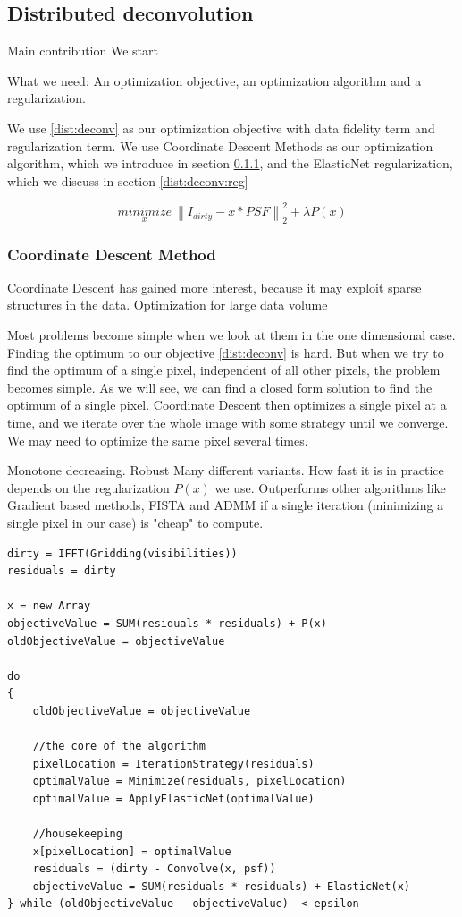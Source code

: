 \subsection{Distributed deconvolution}

Main contribution
We start 

What we need: An optimization objective, an optimization algorithm and a regularization. 

We use \eqref{dist:deconv} as our optimization objective with data fidelity term and regularization term. We use Coordinate Descent Methods as our optimization algorithm, which we introduce in section \ref{dist:deconv:cd}, and the ElasticNet regularization, which we discuss in section \ref{dist:deconv:reg}

\begin{equation}\label{dist:deconv}
\underset{x}{minimize} \: \left \| I_{dirty} - x * PSF \right \|_2^2 + \lambda P(x)
\end{equation}



\subsubsection{Coordinate Descent Method}\label{dist:deconv:cd}
Coordinate Descent has gained more interest, because it may exploit sparse structures in the data.
Optimization for large data volume

Most problems become simple when we look at them in the one dimensional case. Finding the optimum to our objective \eqref{dist:deconv} is hard. But when we try to find the optimum of a single pixel, independent of all other pixels, the problem becomes simple. As we will see, we can find a closed form solution to find the optimum of a single pixel.
Coordinate Descent then optimizes a single pixel at a time, and we iterate over the whole image with some strategy until we converge. We may need to optimize the same pixel several times.

Monotone decreasing.
Robust
Many different variants.
How fast it is in practice depends on the regularization $P(x)$ we use.
Outperforms other algorithms like Gradient based methods, FISTA and ADMM if a single iteration (minimizing a single pixel in our case) is "cheap" to compute. 

\begin{lstlisting}
dirty = IFFT(Gridding(visibilities))
residuals = dirty

x = new Array
objectiveValue = SUM(residuals * residuals) + P(x)
oldObjectiveValue = objectiveValue

do 
{
	oldObjectiveValue = objectiveValue

	//the core of the algorithm
	pixelLocation = IterationStrategy(residuals)
	optimalValue = Minimize(residuals, pixelLocation)
	optimalValue = ApplyElasticNet(optimalValue)
	
	//housekeeping
	x[pixelLocation] = optimalValue
	residuals = (dirty - Convolve(x, psf))
	objectiveValue = SUM(residuals * residuals) + ElasticNet(x)
} while (oldObjectiveValue - objectiveValue)  < epsilon
\end{lstlisting}

